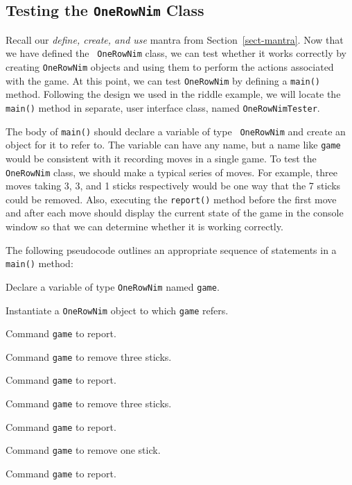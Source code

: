 \subsection{Testing the {\tt OneRowNim} Class}

\noindent Recall our {\em define, create, and use} mantra from
Section~\ref{sect-mantra}.  Now that we have defined the {\tt
OneRowNim} class, we can test whether it works correctly by creating
{\tt OneRowNim} objects and using them to perform the actions
associated with the game.  At this point, we can test {\tt OneRowNim}
by defining a {\tt main()} method. Following the design we used in the
riddle example, we will locate the {\tt main()} method in separate,
user interface class, named {\tt OneRowNimTester}.

The body of {\tt main()} should declare a variable of type {\tt
OneRowNim} and create an object for it to refer to.  The variable can
have any name, but a name like {\tt game} would be consistent with it
recording moves in a single game.  To test the {\tt OneRowNim} class,
we should make a typical series of moves. For example, three moves
taking 3, 3, and 1 sticks respectively would be one way that the 7
sticks could be removed.  Also, executing the {\tt report()} method
before the first move and after each move should display the current
state of the game in the console window so that we can determine
whether it is working correctly.

The following pseudocode outlines an appropriate sequence of
statements in a {\tt main()} method:

\begin{minipage}[t]{26pc}
\begin{NL}
\item  Declare a variable of type {\tt OneRowNim} named {\tt game}.
\item  Instantiate a {\tt OneRowNim} object to which {\tt game} refers.
\item  Command {\tt game} to report.
\item  Command {\tt game} to remove three sticks.
\item  Command {\tt game} to report.
\item  Command {\tt game} to remove three sticks.
\item  Command {\tt game} to report.
\item  Command {\tt game} to remove one stick.
\item  Command {\tt game} to report.
\end{NL}
\end{minipage}
\vspace*{10pt plus5pt minus2pt}

